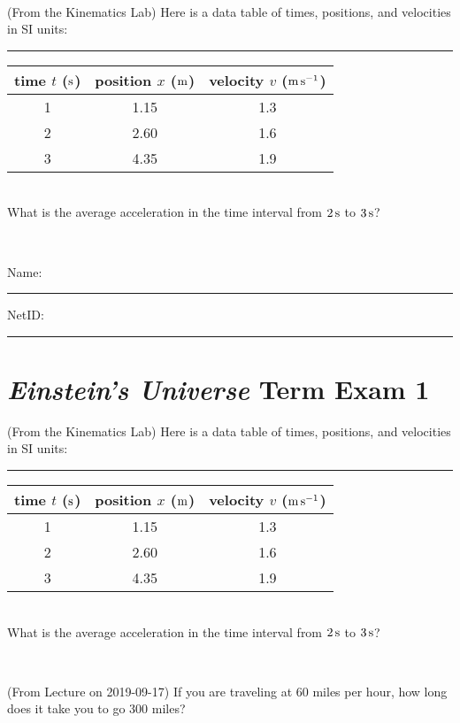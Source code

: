 \documentclass[12pt, letterpaper]{article}
\begin{document}
\vfill ~

\begin{problem} (From the Kinematics Lab)
Here is a data table of times, positions, and velocities in SI units:\\
\rule{1.0in}{0pt}\begin{tabular}{c|c|c}
time $t$ ($\mathrm{s}$) & position $x$ ($\mathrm{m}$) & velocity $v$ ($\mathrm{m}\,\mathrm{s}^{-1}$) \\
\hline
1 & 1.15 & 1.3 \\
2 & 2.60 & 1.6 \\
3 & 4.35 & 1.9 \\
\hline
\end{tabular}\\
What is the average acceleration in the time interval from $2\,\mathrm{s}$ to $3\,\mathrm{s}$?
\end{problem}


\vfill ~


\cleardoublepage



\noindent
Name: \rule[-1ex]{0.60\textwidth}{0.1pt}
NetID: \rule[-1ex]{0.20\textwidth}{0.1pt}

\section*{\textsl{Einstein's Universe} Term Exam 1}
\setcounter{problem}{1}


\begin{problem} (From the Kinematics Lab)
Here is a data table of times, positions, and velocities in SI units:\\
\rule{1.0in}{0pt}\begin{tabular}{c|c|c}
time $t$ ($\mathrm{s}$) & position $x$ ($\mathrm{m}$) & velocity $v$ ($\mathrm{m}\,\mathrm{s}^{-1}$) \\
\hline
1 & 1.15 & 1.3 \\
2 & 2.60 & 1.6 \\
3 & 4.35 & 1.9 \\
\hline
\end{tabular}\\
What is the average acceleration in the time interval from $2\,\mathrm{s}$ to $3\,\mathrm{s}$?
\end{problem}


\vfill ~

\begin{problem} (From Lecture on 2019-09-17)
If you are traveling at 60 miles per hour, how long does
it take you to go 300 miles?
\end{problem}
\end{document}
